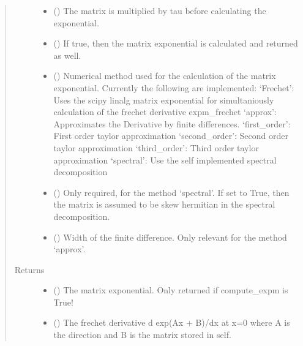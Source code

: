 \documentclass[letterpaper,10pt,english]{sphinxmanual}
\begin{document}
\begin{fulllineitems}
\begin{fulllineitems}
\begin{quote}
\begin{description}
\begin{itemize}
\item {} 
 () \textendash{} The matrix is multiplied by tau before calculating the exponential.

\item {} 
 () \textendash{} If true, then the matrix exponential is calculated and returned as
well.

\item {} 
 () \textendash{} Numerical method used for the calculation of the matrix
exponential.
Currently the following are implemented:
\sphinxhyphen{} ‘Frechet’: Uses the scipy linalg matrix exponential for
simultaniously calculation of the frechet derivative expm\_frechet
\sphinxhyphen{} ‘approx’: Approximates the Derivative by finite differences.
\sphinxhyphen{} ‘first\_order’: First order taylor approximation
\sphinxhyphen{} ‘second\_order’: Second order taylor approximation
\sphinxhyphen{} ‘third\_order’: Third order taylor approximation
\sphinxhyphen{} ‘spectral’: Use the self implemented spectral decomposition

\item {} 
 () \textendash{} Only required, for the method ‘spectral’. If set to True, then the
matrix is assumed to be skew hermitian in the spectral
decomposition.

\item {} 
 () \textendash{} Width of the finite difference. Only relevant for the method
‘approx’.

\end{itemize}

\item[{Returns}] \leavevmode
\begin{itemize}
\item {} 
 () \textendash{} The matrix exponential. Only returned if compute\_expm is True!

\item {} 
 () \textendash{} The frechet derivative d exp(Ax + B)/dx at x=0 where A is the
direction and B is the matrix stored in self.


\end{itemize}
\end{description}
\end{quote}
\end{fulllineitems}
\end{fulllineitems}
\end{document}
